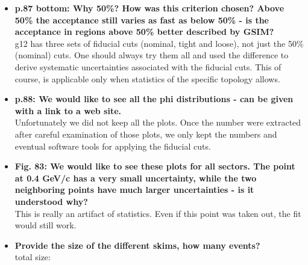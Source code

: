 \documentclass[ 12 pt]{article}
\begin{document}
\begin{itemize}
\item \textbf{p.87 bottom: Why 50\%? How was this criterion chosen? Above 50\% the
acceptance still varies as fast as below 50\% - is the acceptance in regions
above 50\% better described by GSIM?}\\

 g12 has three sets of fiducial cuts (nominal, tight and loose), not just the 50\% (nominal) cuts. One should always try them all and used the difference to derive systematic uncertainties associated with the fiducial cuts. This of course, is applicable only when statistics of the specific topology allows.

\item \textbf{p.88: We would like to see all the phi distributions - can be given with a link
to a web site.}\\

Unfortunately we did not keep all the plots. Once the number were extracted after careful examination of those plots, we only kept the numbers and eventual software tools for applying the fiducial cuts.


\item \textbf{Fig. 83: We would like to see these plots for all sectors. The point at 0.4 GeV/c
has a very small uncertainty, while the two neighboring points have much
larger uncertainties - is it understood why?}\\

This is really an artifact of statistics. Even if this point was taken out, the fit would still work.

\item \textbf{Provide the size of the different skims, how many events?}\\

total size:\\


\end{itemize}
\end{document}
